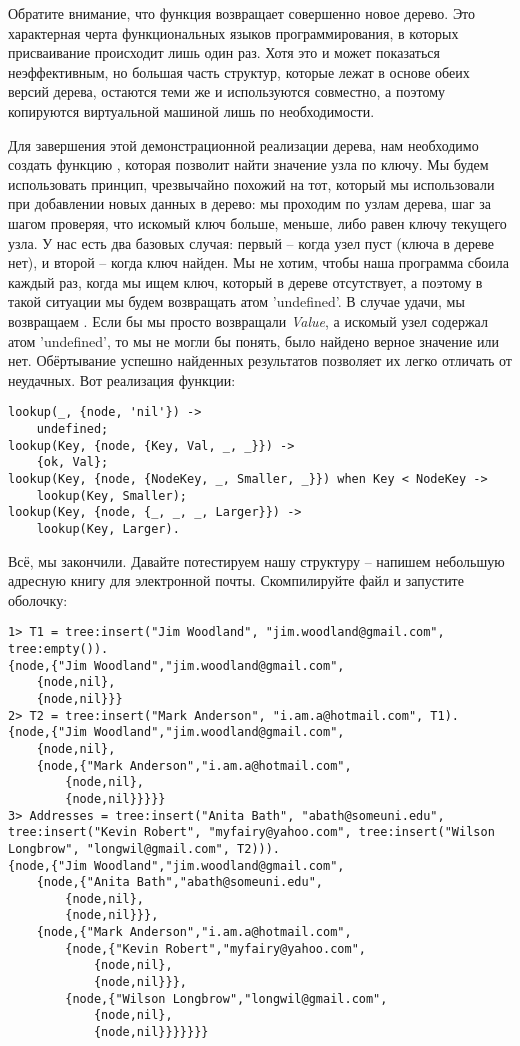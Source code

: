 Обратите внимание, что функция возвращает совершенно новое дерево. Это характерная черта функциональных языков программирования, в которых присваивание происходит лишь один раз. Хотя это и может показаться неэффективным, но большая часть структур, которые лежат в основе обеих версий дерева, остаются теми же и используются совместно, а поэтому копируются виртуальной машиной лишь по необходимости.

Для завершения этой демонстрационной реализации дерева, нам необходимо создать функцию , которая позволит найти значение узла по ключу. Мы будем использовать принцип, чрезвычайно похожий на тот, который мы использовали при добавлении новых данных в дерево: мы проходим по узлам дерева, шаг за шагом проверяя, что искомый ключ больше, меньше, либо равен ключу текущего узла. У нас есть два базовых случая: первый \--- когда узел пуст (ключа в дереве нет), и второй \--- когда ключ найден. Мы не хотим, чтобы наша программа сбоила каждый раз, когда мы ищем ключ, который в дереве отсутствует, а поэтому в такой ситуации мы будем возвращать атом 'undefined'. В случае удачи, мы возвращаем . Если бы мы просто возвращали \emph{Value}, а искомый узел содержал атом 'undefined', то мы не могли бы понять, было найдено верное значение или нет. Обёртывание успешно найденных результатов позволяет их легко отличать от неудачных. Вот реализация функции:
\begin{lstlisting}[style=erlang]
lookup(_, {node, 'nil'}) ->
    undefined;
lookup(Key, {node, {Key, Val, _, _}}) ->
    {ok, Val};
lookup(Key, {node, {NodeKey, _, Smaller, _}}) when Key < NodeKey ->
    lookup(Key, Smaller);
lookup(Key, {node, {_, _, _, Larger}}) ->
    lookup(Key, Larger).
\end{lstlisting}

Всё, мы закончили. Давайте потестируем нашу структуру \--- напишем небольшую адресную книгу для электронной почты. Скомпилируйте файл и запустите оболочку:
\begin{lstlisting}[style=erlang]
1> T1 = tree:insert("Jim Woodland", "jim.woodland@gmail.com", tree:empty()).
{node,{"Jim Woodland","jim.woodland@gmail.com",
    {node,nil},
    {node,nil}}}
2> T2 = tree:insert("Mark Anderson", "i.am.a@hotmail.com", T1).
{node,{"Jim Woodland","jim.woodland@gmail.com",
    {node,nil},
    {node,{"Mark Anderson","i.am.a@hotmail.com",
        {node,nil},
        {node,nil}}}}}
3> Addresses = tree:insert("Anita Bath", "abath@someuni.edu", tree:insert("Kevin Robert", "myfairy@yahoo.com", tree:insert("Wilson Longbrow", "longwil@gmail.com", T2))).
{node,{"Jim Woodland","jim.woodland@gmail.com",
    {node,{"Anita Bath","abath@someuni.edu",
        {node,nil},
        {node,nil}}},
    {node,{"Mark Anderson","i.am.a@hotmail.com",
        {node,{"Kevin Robert","myfairy@yahoo.com",
            {node,nil},
            {node,nil}}},
        {node,{"Wilson Longbrow","longwil@gmail.com",
            {node,nil},
            {node,nil}}}}}}}
\end{lstlisting}

